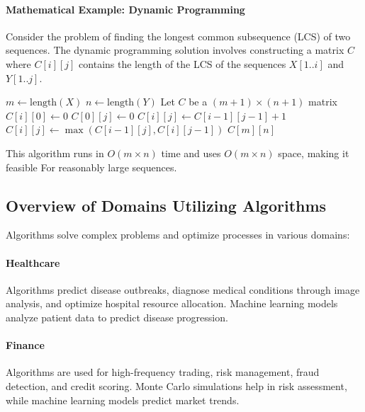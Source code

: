 \documentclass[12pt]{book} %
\begin{document}
\paragraph{Mathematical Example: Dynamic Programming}
Consider the problem of finding the longest common subsequence (LCS) of two sequences. The dynamic programming solution involves constructing a matrix $C$ where $C[i][j]$ contains the length of the LCS of the sequences $X[1..i]$ and $Y[1..j]$.
\FloatBarrier
\begin{algorithm}[H]
\caption{Longest Common Subsequence (LCS)}
\begin{algorithmic}[1]
\State $m \gets \text{length}(X)$
\State $n \gets \text{length}(Y)$
\State Let $C$ be a $(m+1) \times (n+1)$ matrix
\State $C[i][0] \gets 0$
\EndFor
{}
\State $C[0][j] \gets 0$
\EndFor
{}
\State $C[i][j] \gets C[i-1][j-1] + 1$
\Else
\State $C[i][j] \gets \max(C[i-1][j], C[i][j-1])$
\EndIf
\EndFor
\EndFor
\State \Return $C[m][n]$
\EndProcedure
\end{algorithmic}
\end{algorithm}
\FloatBarrier
This algorithm runs in $O(m \times n)$ time and uses $O(m \times n)$ space, making it feasible For reasonably large sequences.

\subsection{Overview of Domains Utilizing Algorithms}
Algorithms solve complex problems and optimize processes in various domains:

\paragraph{Healthcare}
Algorithms predict disease outbreaks, diagnose medical conditions through image analysis, and optimize hospital resource allocation. Machine learning models analyze patient data to predict disease progression.

\paragraph{Finance}
Algorithms are used for high-frequency trading, risk management, fraud detection, and credit scoring. Monte Carlo simulations help in risk assessment, while machine learning models predict market trends.
\end{document}
